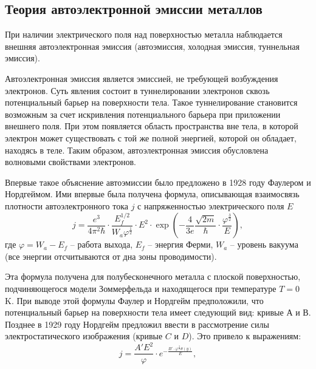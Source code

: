 \documentclass[a4paper, 12pt]{article}
\begin{document}
	\subsection{Теория автоэлектронной эмиссии металлов}
	При наличии электрического поля над поверхностью металла наблюдается внешняя автоэлектронная эмиссия (автоэмиссия, холодная эмиссия, туннельная эмиссия).\par
	Автоэлектронная эмиссия является эмиссией, не требующей возбуждения электронов. Суть явления состоит в туннелировании электронов сквозь потенциальный барьер на поверхности тела. Такое туннелирование становится возможным за счет искривления потенциального барьера при приложении внешнего поля. При этом появляется область пространства вне тела, в которой электрон может существовать с той же полной энергией, которой он обладает, находясь в теле. Таким образом, автоэлектронная эмиссия обусловлена волновыми свойствами электронов.\par
	Впервые такое объяснение автоэмиссии было предложено в 1928 году Фаулером и Нордгеймом. Ими впервые была получена формула, описывающая взаимосвязь плотности автоэлектронного тока $j$ с напряженностью электрического поля $E$
	\begin{equation}
		j=\frac{e^3}{4\pi^2\hbar}\cdot\frac{E^{1/2}_f}{W_a\varphi^{\frac{1}{2}}}\cdot E^2\cdot\exp\left(-\frac{4}{3e}\frac{\sqrt{2m}}{\hbar}\cdot\frac{\varphi^{\frac{3}{2}}}{E} \right),
	\end{equation}
	где $\varphi=W_a-E_f$ -- работа выхода, $E_f$ -- энергия Ферми, $W_a$ -- уровень вакуума (все энергии отсчитываются от дна зоны проводимости).\par
	Эта формула получена для полубесконечного металла с плоской поверхностью, подчиняющегося модели Зоммерфельда и находящегося при температуре $T=0$ K. При выводе этой формулы Фаулер и Нордгейм предположили, что потенциальный барьер на поверхности тела имеет следующий вид: кривые $А$ и $В$. Позднее в 1929 году Нордгейм предложил ввести в рассмотрение силы электростатического изображения (кривые $C$ и $D$). Это привело к выражениям:
	\begin{equation}
		j=\frac{A'E^2}{\varphi}\cdot e^{-\frac{B'\cdot \varphi^{\frac{3}{2}}\theta(y)}{E}},	
	\end{equation}
\end{document}
